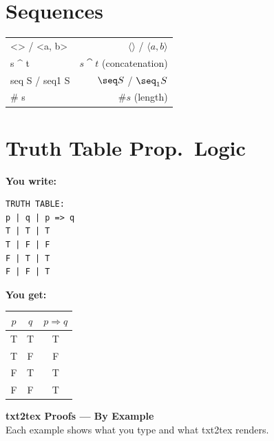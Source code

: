 \documentclass[10pt,landscape,a4paper]{article}
\newenvironment{exwrite}%
  {\par\noindent\scriptsize\textbf{You write:}\par\vspace{0pt}\scriptsize}%
  {\vspace{1pt}}
\newenvironment{exget}%
  {\par\noindent\scriptsize\textbf{You get:}\par\vspace{0pt}\small}%
  {\par\vspace{3pt}}
\begin{document}
\begin{multicols}{3}
\section{Sequences}

\begin{tabularx}{\columnwidth}{LR}
<> / <a, b>          & $\langle\rangle$ / $\langle a, b \rangle$ \\
s \textasciicircum{} t  & $s \cat t$ (concatenation) \\
seq S / seq1 S       & $\seq S$ / $\seq_1 S$ \\
\# s                 & $\# s$ (length) \\
\end{tabularx}


\section{Truth Table {\normalsize\color{gray}\textrm{\scriptsize Prop.\ Logic}}}

\begin{exwrite}%
\begin{verbatim}
TRUTH TABLE:
p | q | p => q
T | T | T
T | F | F
F | T | T
F | F | T
\end{verbatim}
\end{exwrite}
\begin{exget}%
\begin{center}
\begin{tabular}{ccc}
$p$ & $q$ & $p \Rightarrow q$ \\ \hline
T & T & T \\
T & F & F \\
F & T & T \\
F & F & T \\
\end{tabular}
\end{center}
\end{exget}

\end{multicols}

\newpage

\begin{center}
{\LARGE\bfseries txt2tex Proofs --- By Example}\\[2pt]
{\small Each example shows what you type and what txt2tex renders.}
\end{center}
\end{document}
